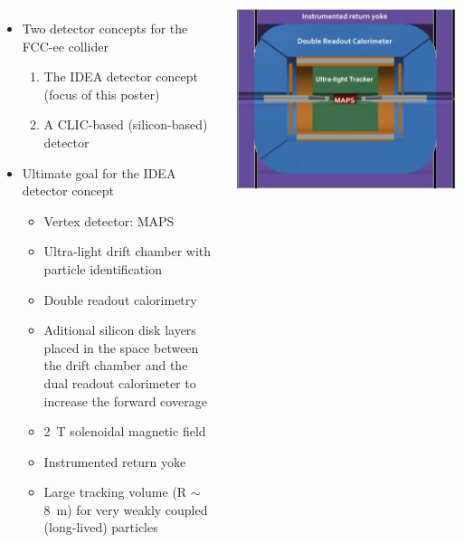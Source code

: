 \documentclass[final,xcolor={dvipsnames,svgnames,x11names,table}]{beamer}
\begin{document}
\begin{frame}
\begin{textblock}{40}
\begin{tcolorbox}[title=The IDEA detector concept for FCC-ee]
  \begin{columns}
      \begin{itemize}
        \item Two detector concepts for the FCC-ee collider
          \begin{enumerate}
            \item The IDEA detector concept (focus of this poster)
            \item A CLIC-based (silicon-based) detector
          \end{enumerate}
        \item Ultimate goal for the IDEA detector concept
          \begin{itemize}
            \item Vertex detector: MAPS
            \item Ultra-light drift chamber with particle identification
            \item Double readout calorimetry
            \item Aditional silicon disk layers placed in the space between the drift chamber and the dual readout calorimeter to increase the forward coverage
            \item 2~T solenoidal magnetic field
            \item Instrumented return yoke
            \item Large tracking volume (R $\sim$ 8~m) for very weakly coupled (long-lived) particles
          \end{itemize}
      \end{itemize}


      \centering
      \includegraphics[width=\textwidth]{../figures/FCCeeIDEAConcept}
  \end{columns}



\end{tcolorbox}
\end{textblock}
\end{frame}
\end{document}
